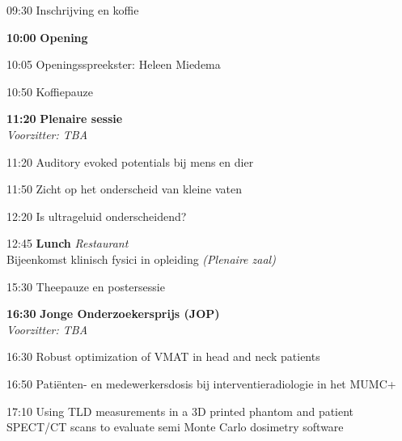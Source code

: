\documentclass[a4paper,10pt]{report}
\begin{document}
\begin{multicols*}{3}
\begin{packed_enum}
    \item[09:30] Inschrijving en koffie
        \vfill
    \item[\textbf{10:00}] \textbf{Opening}
        \vfill
    \item[10:05] Openingsspreekster: Heleen Miedema
        \vfill
    \item[10:50] Koffiepauze
        \vfill
    \item[\textbf{11:20}] {\textbf{Plenaire sessie}}\\\textit{Voorzitter: TBA}
        \item[11:20] Auditory evoked potentials bij mens en dier
        \item[11:50] Zicht op het onderscheid van kleine vaten
        \item[12:20] Is ultrageluid onderscheidend?
        \vfill
    \item[12:45] \textbf{Lunch} \hfill{\small \textit{Restaurant}}\\
        {\small Bijeenkomst klinisch fysici in opleiding \hfill\textit{(Plenaire zaal)}}
        \vfill
    \item[{\color{DarkBlue}{\textbf{14:00}}}]{ }
        \vfill
    \item[15:30] Theepauze en postersessie 
        \vfill
    \item[\textbf{16:30}] {\textbf{Jonge Onderzoekersprijs (JOP)}}\\\textit{Voorzitter: TBA}
    \item[16:30] Robust optimization of VMAT in head and neck patients
    \item[16:50] Patiënten- en medewerkersdosis bij interventieradiologie in het MUMC+
    \item[17:10] Using TLD measurements in a 3D printed phantom and patient SPECT/CT scans to evaluate semi Monte Carlo dosimetry software

\end{packed_enum}
\end{multicols*}
\end{document}
